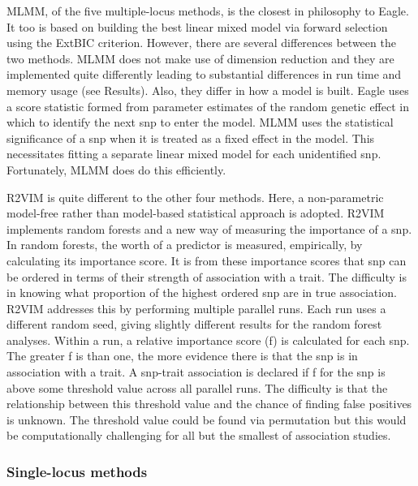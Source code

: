 \documentclass{article}
\begin{document}
MLMM, of the five multiple-locus methods, is the closest in philosophy to Eagle. It too is based on  building the 
best  linear mixed model via forward selection using the ExtBIC criterion. 
However, there are several differences between the two methods.
 MLMM does not make use of dimension reduction and they are implemented quite differently leading to substantial 
 differences  in run time and memory usage (see Results).  Also, they differ in how a model is built. 
 Eagle uses a score statistic formed from parameter estimates of the random genetic effect in which to identify the next snp to enter 
 the model.  MLMM uses the statistical significance of a snp when it is treated as a fixed effect in the model. 
 This necessitates fitting a separate linear mixed model for each unidentified snp. Fortunately,  MLMM does do this 
 efficiently.
 
R2VIM is quite different to the other four methods. Here, a non-parametric model-free rather than model-based statistical approach is adopted. 
R2VIM implements random forests and a new way of measuring the importance of a snp.  
In random forests, the worth of a predictor is measured, empirically, by calculating its importance score. 
It is from these importance scores that snp can be ordered in terms of their strength of association with a trait. 
The difficulty is in knowing what proportion of the 
highest ordered snp are in true association. R2VIM addresses this by performing multiple parallel runs. Each run uses a different 
random seed, giving slightly different results for the random forest analyses. Within a run, a relative importance score (f) is calculated for 
each snp. The greater f is than one, the more evidence there is that the snp is in association with a trait.  A snp-trait association is 
declared if f for the snp is above some threshold value across all parallel runs. The difficulty is that the relationship between 
this threshold value and the chance of finding false positives is unknown.  The threshold value could be found via permutation but 
this would be computationally challenging for all but the smallest of association studies. 


\subsubsection{Single-locus methods}
\end{document}
